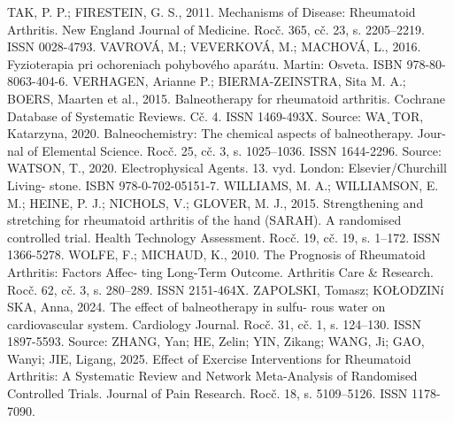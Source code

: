 TAK, P. P.; FIRESTEIN, G. S., 2011. Mechanisms of Disease: Rheumatoid Arthritis. New
England Journal of Medicine. Rocč. 365, cč. 23, s. 2205–2219. ISSN 0028-4793.
VAVROVÁ, M.; VEVERKOVÁ, M.; MACHOVÁ, L., 2016. Fyzioterapia pri ochoreniach
pohybového aparátu. Martin: Osveta. ISBN 978-80-8063-404-6.
VERHAGEN, Arianne P.; BIERMA-ZEINSTRA, Sita M. A.; BOERS, Maarten et al., 2015.
Balneotherapy for rheumatoid arthritis. Cochrane Database of Systematic Reviews. Cč. 4.
ISSN 1469-493X. Source:
WA˛TOR, Katarzyna, 2020. Balneochemistry: The chemical aspects of balneotherapy. Jour-
nal of Elemental Science. Rocč. 25, cč. 3, s. 1025–1036. ISSN 1644-2296. Source:
WATSON, T., 2020. Electrophysical Agents. 13. vyd. London: Elsevier/Churchill Living-
stone. ISBN 978-0-702-05151-7.
WILLIAMS, M. A.; WILLIAMSON, E. M.; HEINE, P. J.; NICHOLS, V.; GLOVER, M. J.,
2015. Strengthening and stretching for rheumatoid arthritis of the hand (SARAH). A
randomised controlled trial. Health Technology Assessment. Rocč. 19, cč. 19, s. 1–172.
ISSN 1366-5278.
WOLFE, F.; MICHAUD, K., 2010. The Prognosis of Rheumatoid Arthritis: Factors Affec-
ting Long-Term Outcome. Arthritis Care & Research. Rocč. 62, cč. 3, s. 280–289. ISSN
2151-464X.
ZAPOLSKI, Tomasz; KOŁODZINí SKA, Anna, 2024. The effect of balneotherapy in sulfu-
rous water on cardiovascular system. Cardiology Journal. Rocč. 31, cč. 1, s. 124–130. ISSN
1897-5593. Source:
ZHANG, Yan; HE, Zelin; YIN, Zikang; WANG, Ji; GAO, Wanyi; JIE, Ligang, 2025. Effect
of Exercise Interventions for Rheumatoid Arthritis: A Systematic Review and Network
Meta-Analysis of Randomised Controlled Trials. Journal of Pain Research. Rocč. 18,
s. 5109–5126. ISSN 1178-7090.


